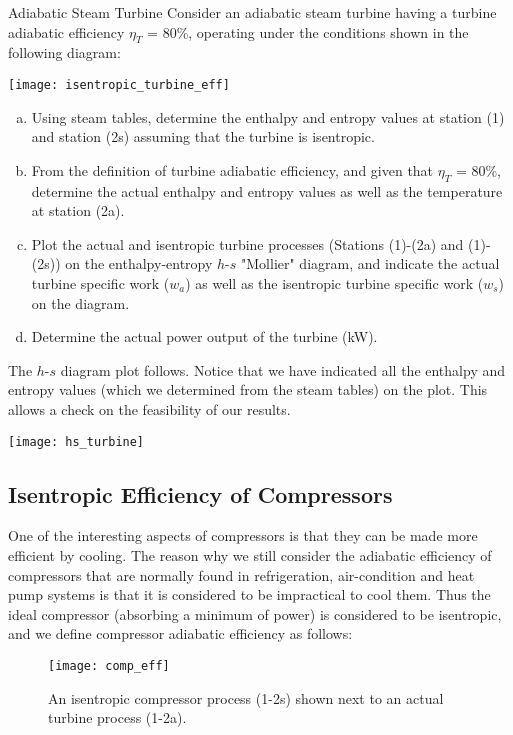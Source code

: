 \begin{example}{Adiabatic Steam Turbine}
  Consider an adiabatic steam turbine having a turbine adiabatic efficiency $\eta_T$ = 80\%, operating under the conditions shown in the following diagram:
  
  \begin{center}
    \texttt{[image: isentropic\_turbine\_eff]}
  \end{center}
  \begin{enumerate}[a)]
  \item Using steam tables, determine the enthalpy and entropy values at station (1) and station (2s) assuming that the turbine is isentropic. \answer{[$h_1$ = 3479 kJ/kg, $s_1$ = 7.764 kJ/kg.K; $h_{2s}$ = 2461 kJ/kg, $s_{2s}$ = $s_1$]}
  \item From the definition of turbine adiabatic efficiency, and given that $\eta_T$ = 80\%, determine the actual enthalpy and entropy values as well as the temperature at station (2a). \answer{[$h_{2a}$ = 2665 kJ/kg, $s_{2a}$ = 8.38 kJ/kg.K, $T_{2a}$ = 88°C]}
  \item Plot the actual and isentropic turbine processes (Stations (1)-(2a) and (1)-(2s)) on the enthalpy-entropy $h$-$s$ "Mollier" diagram, and indicate the actual turbine specific work ($w_a$) as well as the isentropic turbine specific work ($w_s$) on the diagram.
  \item Determine the actual power output of the turbine (kW). \answer{[1629 kW]}
  \end{enumerate}

  The $h$-$s$ diagram plot follows. Notice that we have indicated all the enthalpy and entropy values (which we determined from the steam tables) on the plot. This allows a check on the feasibility of our results.

  \begin{center}
    \texttt{[image: hs\_turbine]}
  \end{center}
  
\end{example}

\subsection{Isentropic Efficiency of Compressors}

One of the interesting aspects of compressors is that they can be made more efficient by cooling. The reason why we still consider the adiabatic efficiency of compressors that are normally found in refrigeration, air-condition and heat pump systems is that it is considered to be impractical to cool them. Thus the ideal compressor (absorbing a minimum of power) is considered to be isentropic, and we define compressor adiabatic efficiency as follows:
\nopagebreak[4]%
\begin{figure}[H]
  \centering
  \texttt{[image: comp\_eff]}
  \caption{An isentropic compressor process (1-2s) shown next to an actual turbine process (1-2a).}
  \label{fig:turbine_eff}
\end{figure}

